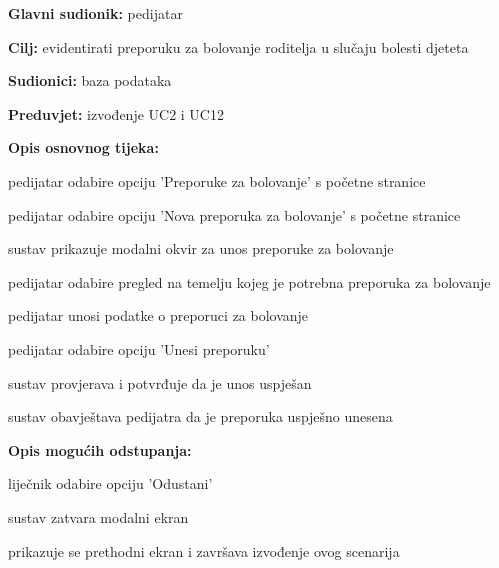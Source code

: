                     \noindent {}
					\begin{packed_item}
	
						\item \textbf{Glavni sudionik: }pedijatar
						\item  \textbf{Cilj:} evidentirati preporuku za bolovanje roditelja u slučaju bolesti djeteta
						\item  \textbf{Sudionici:} baza podataka
						\item  \textbf{Preduvjet:} izvođenje UC2 i UC12
						\item  \textbf{Opis osnovnog tijeka:}
						
						\item[] \begin{packed_enum}
							\item pedijatar odabire opciju 'Preporuke za bolovanje' s početne stranice
							\item pedijatar odabire opciju 'Nova preporuka za bolovanje' s početne stranice
							\item sustav prikazuje modalni okvir za unos preporuke za bolovanje
							\item pedijatar odabire pregled na temelju kojeg je potrebna preporuka za bolovanje
							\item pedijatar unosi podatke o preporuci za bolovanje
							\item pedijatar odabire opciju 'Unesi preporuku'
							\item sustav provjerava i potvrđuje da je unos uspješan
							\item sustav obavještava pedijatra da je preporuka uspješno unesena
				
						\end{packed_enum}
						\item  \textbf{Opis mogućih odstupanja:}
						
						\item[] \begin{packed_item}
	
							\item[6.a] liječnik odabire opciju 'Odustani'
							\item [] \begin{packed_enum}
								\item sustav zatvara modalni ekran
								\item prikazuje se prethodni ekran i završava izvođenje ovog scenarija
							\end{packed_enum}
						\end{packed_item}
                    \end{packed_item}
						
